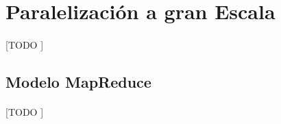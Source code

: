 \documentclass{article}
\begin{document}
  \section{Paralelización a gran Escala}

    \paragraph{}
    [TODO ]

    \subsection{Modelo MapReduce}

      \paragraph{}
      [TODO ]
\end{document}
